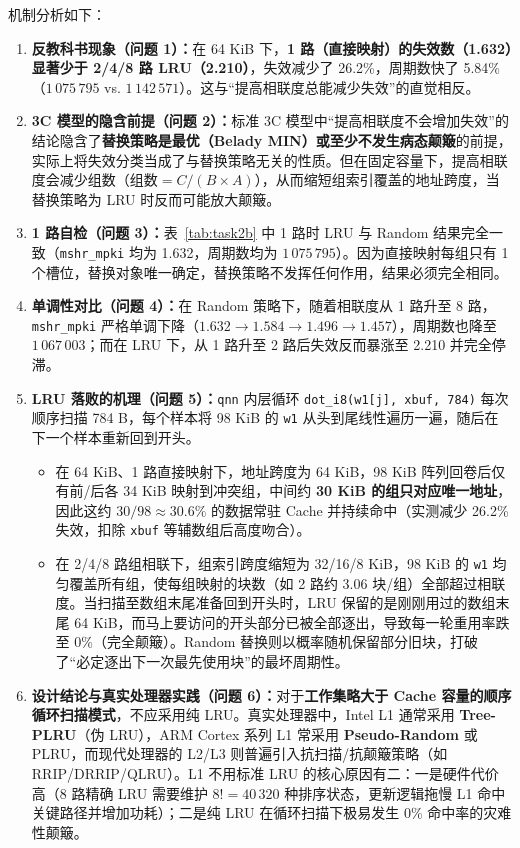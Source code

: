 \documentclass[12pt,a4paper,fontset=mac]{ctexart}
\begin{document}
机制分析如下：
\begin{enumerate}
  \item \textbf{反教科书现象（问题 1）：}在 64 KiB 下，\textbf{1 路（直接映射）的失效数（1.632）显著少于 2/4/8 路 LRU（2.210）}，失效减少了 26.2\%，周期数快了 5.84\%（$1\,075\,795$ vs. $1\,142\,571$）。这与“提高相联度总能减少失效”的直觉相反。
  \item \textbf{3C 模型的隐含前提（问题 2）：}标准 3C 模型中“提高相联度不会增加失效”的结论隐含了\textbf{替换策略是最优（Belady MIN）或至少不发生病态颠簸}的前提，实际上将失效分类当成了与替换策略无关的性质。但在固定容量下，提高相联度会减少组数（$\text{组数} = C / (B \times A)$），从而缩短组索引覆盖的地址跨度，当替换策略为 LRU 时反而可能放大颠簸。
  \item \textbf{1 路自检（问题 3）：}表~\ref{tab:task2b} 中 1 路时 LRU 与 Random 结果完全一致（\texttt{mshr\_mpki} 均为 1.632，周期数均为 $1\,075\,795$）。因为直接映射每组只有 1 个槽位，替换对象唯一确定，替换策略不发挥任何作用，结果必须完全相同。
  \item \textbf{单调性对比（问题 4）：}在 Random 策略下，随着相联度从 1 路升至 8 路，\texttt{mshr\_mpki} 严格单调下降（$1.632 \to 1.584 \to 1.496 \to 1.457$），周期数也降至 $1\,067\,003$；而在 LRU 下，从 1 路升至 2 路后失效反而暴涨至 2.210 并完全停滞。
  \item \textbf{LRU 落败的机理（问题 5）：}\texttt{qnn} 内层循环 \texttt{dot\_i8(w1[j], xbuf, 784)} 每次顺序扫描 784 B，每个样本将 98 KiB 的 \texttt{w1} 从头到尾线性遍历一遍，随后在下一个样本重新回到开头。
  \begin{itemize}
    \item 在 64 KiB、1 路直接映射下，地址跨度为 64 KiB，98 KiB 阵列回卷后仅有前/后各 34 KiB 映射到冲突组，中间约 \textbf{30 KiB 的组只对应唯一地址}，因此这约 $30/98 \approx 30.6\%$ 的数据常驻 Cache 并持续命中（实测减少 26.2\% 失效，扣除 \texttt{xbuf} 等辅数组后高度吻合）。
    \item 在 2/4/8 路组相联下，组索引跨度缩短为 32/16/8 KiB，98 KiB 的 \texttt{w1} 均匀覆盖所有组，使每组映射的块数（如 2 路约 3.06 块/组）全部超过相联度。当扫描至数组末尾准备回到开头时，LRU 保留的是刚刚用过的数组末尾 64 KiB，而马上要访问的开头部分已被全部逐出，导致每一轮重用率跌至 0\%（完全颠簸）。Random 替换则以概率随机保留部分旧块，打破了“必定逐出下一次最先使用块”的最坏周期性。
  \end{itemize}
  \item \textbf{设计结论与真实处理器实践（问题 6）：}对于\textbf{工作集略大于 Cache 容量的顺序循环扫描模式}，不应采用纯 LRU。真实处理器中，Intel L1 通常采用 \textbf{Tree-PLRU}（伪 LRU），ARM Cortex 系列 L1 常采用 \textbf{Pseudo-Random} 或 PLRU，而现代处理器的 L2/L3 则普遍引入抗扫描/抗颠簸策略（如 RRIP/DRRIP/QLRU）。L1 不用标准 LRU 的核心原因有二：一是硬件代价高（8 路精确 LRU 需要维护 $8!=40\,320$ 种排序状态，更新逻辑拖慢 L1 命中关键路径并增加功耗）；二是纯 LRU 在循环扫描下极易发生 0\% 命中率的灾难性颠簸。
\end{enumerate}
\end{document}
